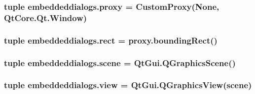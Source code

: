 \subsubsection[{proxy}]{\setlength{\rightskip}{0pt plus 5cm}tuple embeddeddialogs.\+proxy = {\bf Custom\+Proxy}(None, Qt\+Core.\+Qt.\+Window)}\label{namespaceembeddeddialogs_adec895560f5227adf32b6ba5383005f4}
\hypertarget{namespaceembeddeddialogs_a5c6caf3719f1f0d3dc8321afd1c5945e}{}
\subsubsection[{rect}]{\setlength{\rightskip}{0pt plus 5cm}tuple embeddeddialogs.\+rect = proxy.\+bounding\+Rect()}\label{namespaceembeddeddialogs_a5c6caf3719f1f0d3dc8321afd1c5945e}
\hypertarget{namespaceembeddeddialogs_ac100c4bc5a05073dfe885fbc7b556586}{}
\subsubsection[{scene}]{\setlength{\rightskip}{0pt plus 5cm}tuple embeddeddialogs.\+scene = Qt\+Gui.\+Q\+Graphics\+Scene()}\label{namespaceembeddeddialogs_ac100c4bc5a05073dfe885fbc7b556586}
\hypertarget{namespaceembeddeddialogs_a91e0c5459cf6b9693b51e82f59c937be}{}
\subsubsection[{view}]{\setlength{\rightskip}{0pt plus 5cm}tuple embeddeddialogs.\+view = Qt\+Gui.\+Q\+Graphics\+View({\bf scene})}\label{namespaceembeddeddialogs_a91e0c5459cf6b9693b51e82f59c937be}
